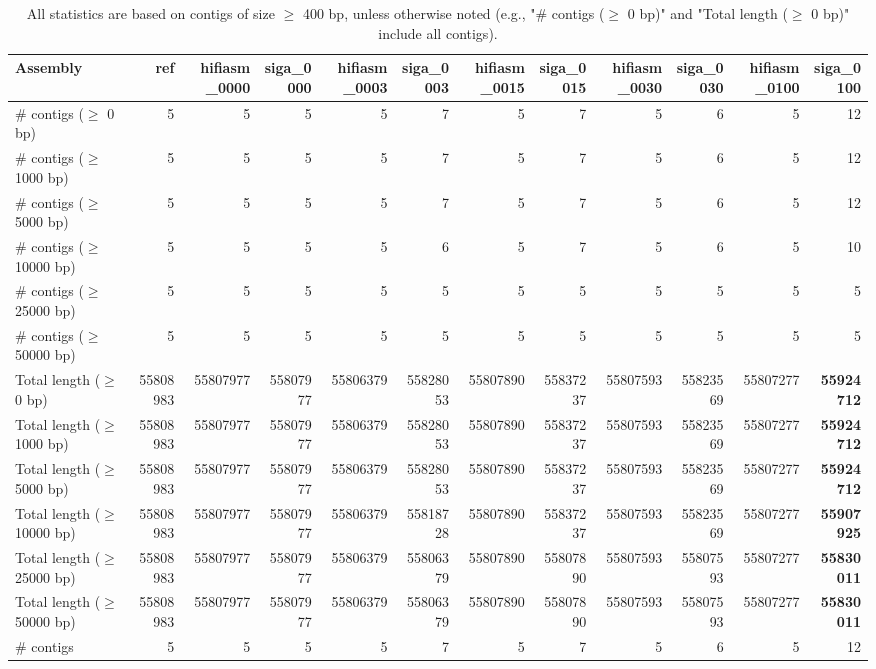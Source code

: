 \documentclass[12pt,a4paper]{article}
\begin{document}
\begin{table}[ht]
\begin{center}
\caption{All statistics are based on contigs of size $\geq$ 400 bp, unless otherwise noted (e.g., "\# contigs ($\geq$ 0 bp)" and "Total length ($\geq$ 0 bp)" include all contigs).}
\begin{tabular}{|l*{11}{|r}|}
\hline
Assembly & ref & hifiasm\_0000 & siga\_0000 & hifiasm\_0003 & siga\_0003 & hifiasm\_0015 & siga\_0015 & hifiasm\_0030 & siga\_0030 & hifiasm\_0100 & siga\_0100 \\ \hline
\# contigs ($\geq$ 0 bp) & 5 & 5 & 5 & 5 & 7 & 5 & 7 & 5 & 6 & 5 & 12 \\ \hline
\# contigs ($\geq$ 1000 bp) & 5 & 5 & 5 & 5 & 7 & 5 & 7 & 5 & 6 & 5 & 12 \\ \hline
\# contigs ($\geq$ 5000 bp) & 5 & 5 & 5 & 5 & 7 & 5 & 7 & 5 & 6 & 5 & 12 \\ \hline
\# contigs ($\geq$ 10000 bp) & 5 & 5 & 5 & 5 & 6 & 5 & 7 & 5 & 6 & 5 & 10 \\ \hline
\# contigs ($\geq$ 25000 bp) & 5 & 5 & 5 & 5 & 5 & 5 & 5 & 5 & 5 & 5 & 5 \\ \hline
\# contigs ($\geq$ 50000 bp) & 5 & 5 & 5 & 5 & 5 & 5 & 5 & 5 & 5 & 5 & 5 \\ \hline
Total length ($\geq$ 0 bp) & 55808983 & 55807977 & 55807977 & 55806379 & 55828053 & 55807890 & 55837237 & 55807593 & 55823569 & 55807277 & {\bf 55924712} \\ \hline
Total length ($\geq$ 1000 bp) & 55808983 & 55807977 & 55807977 & 55806379 & 55828053 & 55807890 & 55837237 & 55807593 & 55823569 & 55807277 & {\bf 55924712} \\ \hline
Total length ($\geq$ 5000 bp) & 55808983 & 55807977 & 55807977 & 55806379 & 55828053 & 55807890 & 55837237 & 55807593 & 55823569 & 55807277 & {\bf 55924712} \\ \hline
Total length ($\geq$ 10000 bp) & 55808983 & 55807977 & 55807977 & 55806379 & 55818728 & 55807890 & 55837237 & 55807593 & 55823569 & 55807277 & {\bf 55907925} \\ \hline
Total length ($\geq$ 25000 bp) & 55808983 & 55807977 & 55807977 & 55806379 & 55806379 & 55807890 & 55807890 & 55807593 & 55807593 & 55807277 & {\bf 55830011} \\ \hline
Total length ($\geq$ 50000 bp) & 55808983 & 55807977 & 55807977 & 55806379 & 55806379 & 55807890 & 55807890 & 55807593 & 55807593 & 55807277 & {\bf 55830011} \\ \hline
\# contigs & 5 & 5 & 5 & 5 & 7 & 5 & 7 & 5 & 6 & 5 & 12 \\ \hline

\end{tabular}
\end{center}
\end{table}
\end{document}
